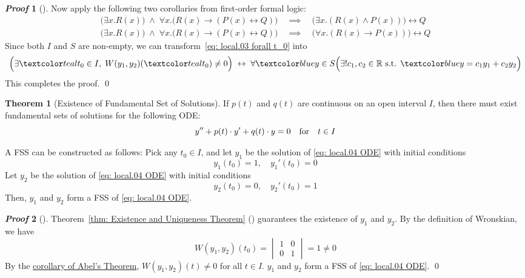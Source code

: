 \documentclass[10pt,UTF8]{article}
\newenvironment{theoremBox}
{
  \begin{tcolorbox}[colback=yellow!5!white,colframe=yellow!75!black,parbox=false,before
  upper=\par,before lower=\par]}
  {
\end{tcolorbox}}
\theoremstyle{definition}
\newtheorem{definition inner}{Definition}[section]
\theoremstyle{definition}
\newtheorem{theorem inner}{Theorem}[section]
\newenvironment{theorem}[1][]
{
  \begin{theoremBox}
  \begin{theorem inner}[#1]\hfill\par}
    {
    \end{theorem inner}
\end{theoremBox}}
\theoremstyle{definition}
\newtheorem*{proof inner}{\textit{Proof}}
\renewenvironment{proof}[1][]
{
\begin{proof inner}[#1]\hfill\par}
  {\qed\vphantom{.}
\end{proof inner}}
\theoremstyle{plain}
\newtheorem{tip inner}{Tip}[section]
\theoremstyle{remark}
\begin{document}
\begin{proof}
  Now apply the following two corollaries
  from first-order formal logic:
  \begin{gather*}
    \Big( \exists x. R(x) \Big) \; \land \;
    \forall x. \Big(R(x) \to (P(x)
    \leftrightarrow Q) \Big)
    \quad\implies\quad
    \Big( \exists x. (R(x) \land P(x)) \Big)
    \leftrightarrow Q \\
    \Big( \exists x. R(x) \Big) \; \land \;
    \forall x. \Big(R(x) \to (P(x)
    \leftrightarrow Q) \Big)
    \quad\implies\quad
    \Big( \forall x. (R(x) \to P(x)) \Big)
    \leftrightarrow Q
  \end{gather*}
  Since both \(I\) and \(S\) are non-empty,
  we can transform~\cref{eq: local.03 forall t_0} into
  \begin{equation*}
    \Big( \exists\teal{t_0} \in I,\;
    W(y_1,y_2)(\teal{t_0}) \neq 0\Big)
    \; \leftrightarrow \;
    \forall \blue{y} \in S \Big(
      \exists! c_1, c_2 \in \mathbb{R} \text{ s.t. }
      \blue{y} = c_1 y_1 + c_2 y_2
    \Big)
  \end{equation*}
  This completes the proof.
\end{proof}

\begin{theorem}[Existence of Fundamental Set of Solutions]
  {}\label{thm: Existence of Fundamental Set of Solutions}
  If \(p(t)\) and \(q(t)\) are continuous on an open interval \(I\),
  then there must exist fundamental sets of solutions for the following ODE\@:
  \begin{equation}
    y'' + p(t)\cdot y' + q(t)\cdot y = 0
    \qfor t \in I
    \label{eq: local.04 ODE}
  \end{equation}

  A FSS can be constructed as follows:
  Pick any \(t_0 \in I\), and let \(y_1\) be the solution
  of \cref{eq: local.04 ODE} with initial conditions
  \begin{equation*}
    y_1(t_0) = 1, \quad y_1'(t_0) = 0
  \end{equation*}
  Let \(y_2\) be the solution of \cref{eq: local.04 ODE} with initial conditions
  \begin{equation*}
    y_2(t_0) = 0, \quad y_2'(t_0) = 1
  \end{equation*}
  Then, \(y_1\) and \(y_2\) form a FSS of \cref{eq: local.04 ODE}.
\end{theorem}

\begin{proof}
  Theorem~\ref{thm: Existence and Uniqueness Theorem}
  ()
  guarantees the existence of \(y_1\) and \(y_2\).
  By the definition of Wronskian, we have
  \begin{equation*}
    W(y_1,y_2)(t_0) =
    \begin{vmatrix}
      1 & 0 \\
      0 & 1
    \end{vmatrix} = 1 \neq 0
  \end{equation*}
  By the \hyperref[thm: corollary of Abel's Theorem]{
  corollary of Abel's Theorem},
  \(W(y_1,y_2)(t) \neq 0\) for all \(t \in I\).
  \(y_1\) and \(y_2\) form a FSS of \cref{eq: local.04 ODE}.
\end{proof}
\end{document}
